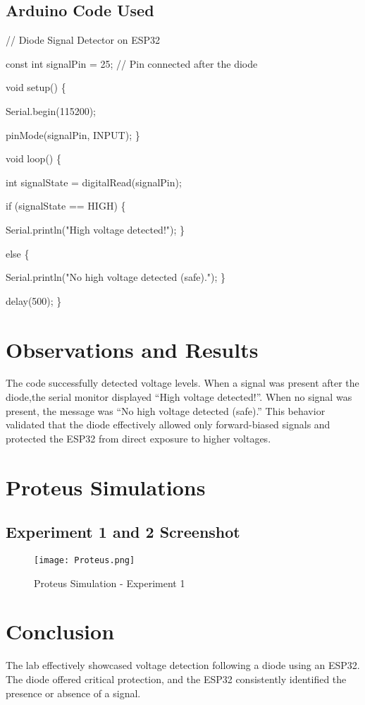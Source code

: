 \documentclass{article}
\begin{document}
\subsection{Arduino Code Used}

\item // Diode Signal Detector on ESP32
\item const int signalPin = 25; // Pin connected after the diode
\item void setup()
  \{
\item Serial.begin(115200);
\item pinMode(signalPin, INPUT);
 \}
\item void loop()
  \{
\item int signalState = digitalRead(signalPin);
\item if (signalState == HIGH)
 \{
\item Serial.println("High voltage detected!");
\}
\item else
  \{
\item Serial.println("No high voltage detected (safe).");
\}
\item delay(500);
\}


\section{Observations and Results}
The code successfully detected voltage levels. When a signal was present after the diode,the serial monitor displayed “High voltage detected!”. When no signal was present, the message was “No high voltage detected (safe).”
This behavior validated that the diode effectively allowed only forward-biased signals and protected the ESP32 from direct exposure to higher voltages.

\newpage

\section{ Proteus Simulations}
\subsection{ Experiment 1 and 2 Screenshot}
\begin{figure}[h]
    \centering
    \texttt{[image: Proteus.png]}
    \caption{Proteus Simulation - Experiment 1}
    \label{fig:image}
\end{figure}

\section{Conclusion}
The lab effectively showcased voltage detection following a diode using an ESP32. The diode offered critical protection, and the ESP32 consistently identified the presence or absence of a signal.
\end{document}

